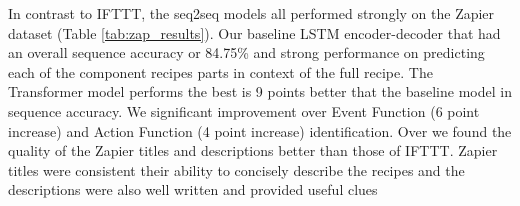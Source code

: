 \documentclass[letterpaper]{article} %
\begin{document}
In contrast to IFTTT, the seq2seq models all performed strongly on the Zapier dataset (Table \ref{tab:zap_results}). Our baseline LSTM encoder-decoder that had an overall sequence accuracy or 84.75\% and strong performance on predicting each of the component recipes parts in context of the full recipe. The Transformer model performs the best is 9 points better that the baseline model in sequence accuracy. We significant improvement over Event Function (6 point increase) and Action Function (4 point increase) identification. Over we found the quality of the Zapier titles and descriptions better than those of IFTTT. Zapier titles were consistent their ability to concisely describe the recipes and the descriptions were also well written and provided useful clues
\begin{table}
\centering
{}
\caption{Distribution of errors across all predictions by domain. }
\label{tab:error}
\end{table}

\vspace{-2.52mm}
\end{document}
